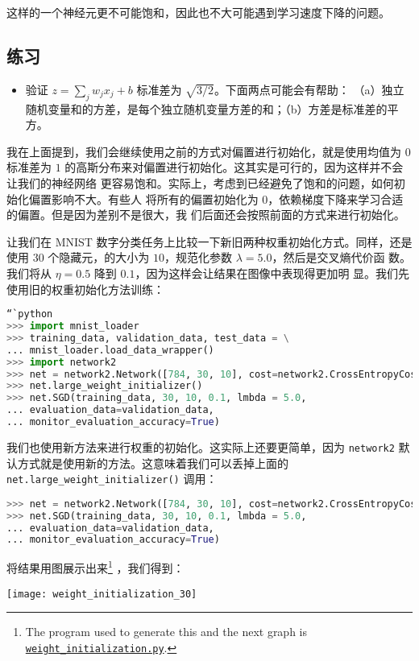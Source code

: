这样的一个神经元更不可能饱和，因此也不大可能遇到学习速度下降的问题。

\subsection*{练习}

\begin{itemize}
\item 验证 $z = \sum_j w_j x_j + b$ 标准差为 $\sqrt{3/2}$。下面两点可能会有帮助：
  （a）独立随机变量和的方差，是每个独立随机变量方差的和；（b）方差是标准差的平方。
\end{itemize}

我在上面提到，我们会继续使用之前的方式对偏置进行初始化，就是使用均值为 $0$ 标准差为
$1$ 的高斯分布来对偏置进行初始化。这其实是可行的，因为这样并不会让我们的神经网络
更容易饱和。实际上，考虑到已经避免了饱和的问题，如何初始化偏置影响不大。有些人
将所有的偏置初始化为 $0$，依赖梯度下降来学习合适的偏置。但是因为差别不是很大，我
们后面还会按照前面的方式来进行初始化。

让我们在 MNIST 数字分类任务上比较一下新旧两种权重初始化方式。同样，还是使用 $30$
个隐藏元，\minibatch 的大小为 $10$，规范化参数 $\lambda = 5.0$，然后是交叉熵代价函
数。我们将\learningrate{}从 $\eta=0.5$ 降到 $0.1$，因为这样会让结果在图像中表现得更加明
显。我们先使用旧的权重初始化方法训练：

\begin{lstlisting}[language=Python]
“`python
>>> import mnist_loader
>>> training_data, validation_data, test_data = \
... mnist_loader.load_data_wrapper()
>>> import network2
>>> net = network2.Network([784, 30, 10], cost=network2.CrossEntropyCost)
>>> net.large_weight_initializer()
>>> net.SGD(training_data, 30, 10, 0.1, lmbda = 5.0,
... evaluation_data=validation_data,
... monitor_evaluation_accuracy=True)
\end{lstlisting}

我们也使用新方法来进行权重的初始化。这实际上还要更简单，因为
\lstinline!network2! 默认方式就是使用新的方法。这意味着我们可以丢掉上面的
\lstinline!net.large_weight_initializer()! 调用：

\begin{lstlisting}[language=Python]
>>> net = network2.Network([784, 30, 10], cost=network2.CrossEntropyCost)
>>> net.SGD(training_data, 30, 10, 0.1, lmbda = 5.0,
... evaluation_data=validation_data,
... monitor_evaluation_accuracy=True)
\end{lstlisting}

将结果用图展示出来\footnote{The program used to generate this and the next graph
  is
  \href{https://github.com/mnielsen/neural-networks-and-deep-learning/blob/master/fig/weight_initialization.py}{\lstinline!weight_initialization.py!}.}
，我们得到：
\begin{center}
    \texttt{[image: weight\_initialization\_30]}
\end{center}

